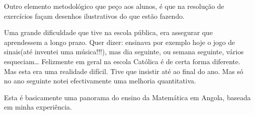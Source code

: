 Outro elemento metodológico que peço aos alunos, é que na resolução de exercícios façam desenhos ilustrativos do que estão fazendo.

Uma grande dificuldade que tive na escola pública, era assegurar que aprendessem a longo prazo. Quer dizer: ensinava por exemplo hoje o jogo de sinais(até inventei uma música!!!), mas dia seguinte, ou semana seguinte, vários esqueciam… Felizmente em geral na escola Católica é de certa forma diferente. Mas esta era uma realidade difícil. Tive que insistir até ao final do ano.  Mas só no ano seguinte notei efectivamente uma melhoria quantitativa.

Esta é basicamente uma panorama do ensino da Matemática em Angola, baseada em minha experiência.




\newpage


